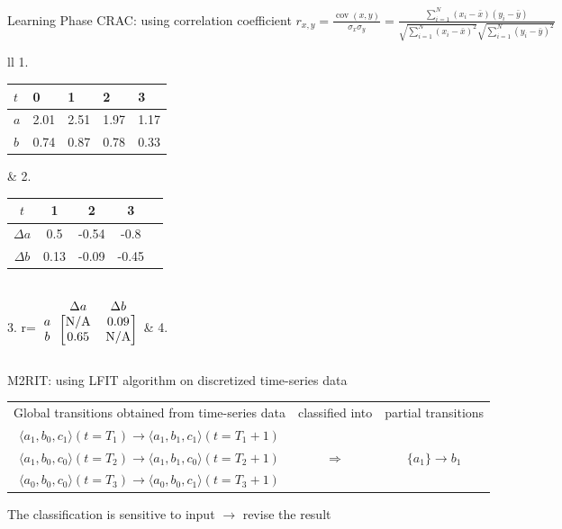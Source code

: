 \documentclass[8pt]{beamer}
\begin{document}
\begin{frame}{Learning Phase}
CRAC: using correlation coefficient $r_{x,y}={\frac {\operatorname {cov} (x,y)}{\sigma _{x}\sigma _{y}}}$\pause$={\frac {\sum _{i=1}^{N}(x_{i}-{\bar {x}})(y_{i}-{\bar {y}})}{{\sqrt {\sum _{i=1}^{N}(x_{i}-{\bar {x}})^{2}}}{\sqrt {\sum _{i=1}^{N}(y_{i}-{\bar {y}})^{2}}}}}$

\pause
\vspace{0.2cm}
\begin{tabular}{ll}
1.\begin{tabular}{l|*{4}{l}}
$t$&0&1&2&3\\
\hline
$a$&2.01&2.51&1.97&1.17\\
$b$&0.74&0.87&0.78&0.33\\
\end{tabular}   
\pause
& 
2.
\begin{tabular}{c|c*{3}{S}}
$t$&1&2&3\\
\hline
$\Delta a$&0.5&-0.54&-0.8\\
$\Delta b$&0.13&-0.09&-0.45\\
\end{tabular}
\pause
\\
3.
r=$ 
\begin{blockarray}{ccc}
&\Delta a&\Delta b  \\
\begin{block}{c[cc]}
a&\text{N/A}&0.09\\
b&0.65&\text{N/A}\\
\end{block}
\end{blockarray}
$
\pause
&
4.
\end{tabular}

\vspace{1.2cm}
\pause

M2RIT: using LFIT algorithm on discretized time-series data

\vspace{0.2cm}
\begin{tabular}{ccc}
    Global transitions obtained from time-series data & classified into & partial transitions\\
    $\langle a_1,b_0,c_1\rangle(t=T_1)\to \langle a_1,b_1,c_1\rangle(t=T_1+1)$&&\\
    $\langle a_1,b_0,c_0\rangle(t=T_2)\to \langle a_1,b_1,c_0\rangle(t=T_2+1)$&$\Longrightarrow$&$\{a_1\}\to b_1$\\
    $\langle a_0,b_0,c_0\rangle(t=T_3)\to \langle a_0,b_0,c_1\rangle(t=T_3+1)$&&
\end{tabular}

\vspace{0.2cm}
\pause
The classification is sensitive to input $\to$ revise the result
\end{frame}
\end{document}
